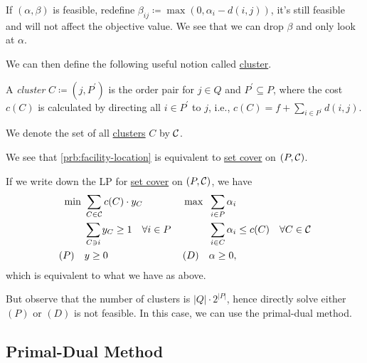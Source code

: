 \begin{remark}
	If \((\alpha , \beta )\) is feasible, redefine \(\beta _{ij} \coloneqq \max (0, \alpha _i - d(i, j))\), it's still feasible and will not affect the objective value. We see that we can drop \(\beta\) and only look at \(\alpha \).
\end{remark}

We can then define the following useful notion called \hyperref[def:cluster]{cluster}.

\begin{definition}[Cluster]\label{def:cluster}
	A \emph{cluster} \(C \coloneqq (j, P^\prime )\) is the order pair for \(j\in Q\) and \(P^\prime \subseteq P\), where the cost \(c(C)\) is calculated by directing all \(i\in P^\prime \) to \(j\), i.e., \(c(C) = f + \sum_{i\in P^\prime }d(i, j)\).
\end{definition}

\begin{notation}
	We denote the set of all \hyperref[def:cluster]{clusters} \(C\) by \(\mathcal{\MakeUppercase{C}} \).
\end{notation}

\begin{remark}
	We see that \autoref{prb:facility-location} is equivalent to \hyperref[prb:set-cover]{set cover} on \((P, \mathcal{\MakeUppercase{C}} )\).
\end{remark}
\begin{explanation}
	If we write down the LP for \hyperref[prb:set-cover]{set cover} on \((P, \mathcal{\MakeUppercase{C}} )\), we have
	\[
		\begin{alignedat}{5}
			\min~&\sum_{C\in \mathcal{\MakeUppercase{C}} } c(C)\cdot y_C\qquad\qquad&&\max ~&&\sum_{i\in P}\alpha _i\\
			& \sum_{C\ni i}y_C  \geq 1 \quad \forall i\in P 				&&		&&\sum_{i\in C} \alpha _{i} \leq c(C)\quad \forall C\in \mathcal{\MakeUppercase{C}}  \\
			(P)\quad	&y\geq  0 	&&(D)\quad&& \alpha \geq 0,
		\end{alignedat}
	\]
	which is equivalent to what we have as above.
\end{explanation}

But observe that the number of clusters is \(\left\vert Q \right\vert \cdot 2^{\left\vert P \right\vert }\), hence directly solve either \((P)\) or \((D)\) is not feasible. In this case, we can use the primal-dual method.

\subsection{Primal-Dual Method}

